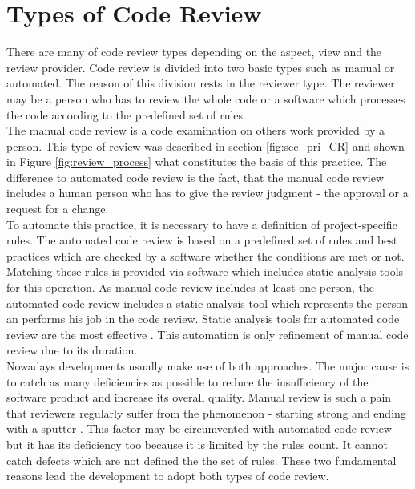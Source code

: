 \section{Types of Code Review}

There are many of code review types depending on the aspect, view and the review provider. Code review is divided into two basic types such as manual or automated. The reason of this division rests in the reviewer type. The reviewer may be a person who has to review the whole code or a software which processes the code according to the predefined set of rules.\\

The manual code review is a code examination on others work provided by a person. This type of review was described in section \ref{fig:sec_pri_CR} and shown in Figure \ref{fig:review_process} what constitutes the basis of this practice. The difference to automated code review is the fact, that the manual code review includes a human person who has to give the review judgment - the approval or a request for a change.\\

To automate this practice, it is necessary to have a definition of project-specific rules. The automated code review is based on a predefined set of rules and best practices which are checked by a software whether the conditions are met or not. Matching these rules is provided via software which includes static analysis tools for this operation. As manual code review includes at least one person, the automated code review includes a static analysis tool which represents the person an performs his job in the code review. Static analysis tools for automated code review are the most effective \cite{CodeReview_security}. This automation is only refinement of manual code review due to its duration.\\

Nowadays developments usually make use of both approaches. The major cause is to catch as many deficiencies as possible to reduce the insufficiency of the software product and increase its overall quality. Manual review is such a pain that reviewers regularly suffer from the  phenomenon - starting strong and ending with a sputter \cite{CodeReview_security}. This factor may be circumvented with automated code review but it has its deficiency too because it is limited by the rules count. It cannot catch defects which are not defined the the set of rules. These two fundamental reasons lead the development to adopt both types of code review.

